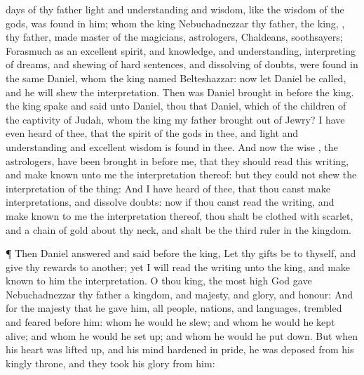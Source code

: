 {days of thy
father
light and
understanding and
wisdom, like the
wisdom of the
gods, was
found in him; whom the
king
Nebuchadnezzar thy
father, the
king,
{}, thy
father,
made
master of the
magicians,
astrologers,
Chaldeans,
{}
soothsayers;
Forasmuch
as an
excellent
spirit, and
knowledge, and
understanding,
interpreting of
dreams, and
shewing of hard
sentences, and
dissolving of
doubts, were
found in the same
Daniel, whom the
king
named
Belteshazzar:
now let
Daniel be
called, and he will
shew the
interpretation.
Then was
Daniel brought
in
before the
king.
{} the
king
spake and
said unto
Daniel,
{}
thou that
Daniel, which
{}
of the
children of the
captivity of
Judah, whom the
king my
father
brought out
of
Jewry?
I have even
heard of thee, that the
spirit of the
gods
{} in
thee, and
{}
light and
understanding and
excellent
wisdom is
found in thee.
And
now the
wise
{}, the
astrologers, have been
brought in
before me, that they should
read
this
writing, and make
known unto me the
interpretation thereof: but they
could
not
shew the
interpretation of the
thing:
And
I have
heard of
thee, that thou
canst
make
interpretations, and
dissolve
doubts:
now
if thou
canst
read the
writing, and make
known to me the
interpretation thereof, thou shalt be
clothed with
scarlet, and
{} a
chain of
gold
about thy
neck, and shalt be the
third
ruler in the
kingdom.
\par }{\PP {}¶
Then
Daniel
answered and
said
before the
king, Let thy
gifts
be to thyself, and
give thy
rewards to
another;
yet I will
read the
writing unto the
king, and make
known to him the
interpretation.
O
thou
king, the most
high
God
gave
Nebuchadnezzar thy
father a
kingdom, and
majesty, and
glory, and
honour:
And
for the
majesty that he
gave him,
all
people,
nations, and
languages,
trembled and
feared
before
him: whom he
would he
slew; and whom he
would he kept
alive; and whom he
would he set
up; and whom he
would he put
down.
But when his
heart was lifted
up, and his
mind
hardened in
pride, he was
deposed
from his
kingly
throne, and they
took his
glory from
him:}
